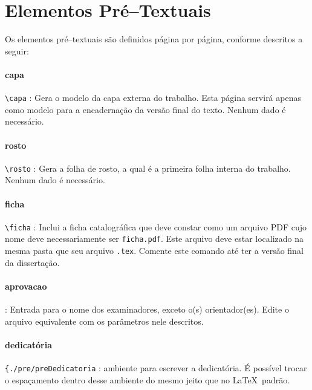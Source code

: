 \section{Elementos Pré--Textuais}
\label{sec:pre}
Os elementos pré--textuais são definidos página por página, conforme descritos a seguir:

\paragraph{capa\\}
\verb|\capa| : Gera o modelo da capa externa do trabalho. Esta página servirá apenas como modelo para a encadernação da versão final do texto. Nenhum dado é necessário.

\paragraph{rosto\\}
\verb|\rosto| : Gera a folha de rosto, a qual é a primeira folha interna do trabalho. Nenhum dado é necessário.

\paragraph{ficha\\}
\verb|\ficha| : Inclui a ficha catalográfica que deve constar como um arquivo PDF cujo nome deve necessariamente ser \verb|ficha.pdf|. Este arquivo deve estar localizado na mesma pasta que seu arquivo \verb|.tex|. Comente este comando até ter a versão final da dissertação.

\paragraph{aprovacao\\}
\verb|| : Entrada para o nome dos examinadores, exceto o(s) orientador(es). Edite o arquivo equivalente com os parâmetros nele descritos.

%

\paragraph{dedicatória\\}
\verb|{./pre/preDedicatoria| : ambiente para escrever a dedicatória. É possível trocar o espaçamento dentro desse ambiente do mesmo jeito que no \LaTeX\ padrão.

